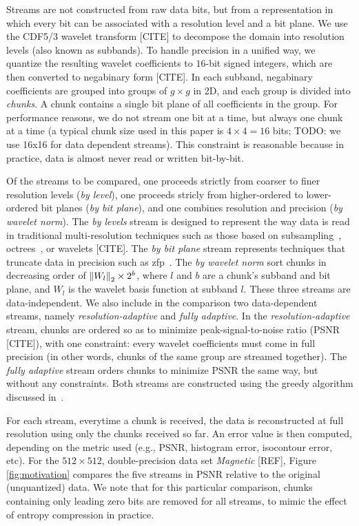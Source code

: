 Streams are not constructed from raw data bits, but from a representation in which every bit can be
associated with a resolution level and a bit plane. We use the CDF5/3 wavelet transform [CITE] to
decompose the domain into resolution levels (also known as subbands). To handle precision in a
unified way, we quantize the resulting wavelet coefficients to $16$-bit signed integers, which are
then converted to negabinary form [CITE]. In each subband, negabinary coefficients are grouped into
groups of $g \times g$ in 2D, and each group is divided into \emph{chunks}. A chunk contains a
single bit plane of all coefficients in the group. For performance reasons, we do not stream one bit
at a time, but always one chunk at a time (a typical chunk size used in this paper is $4 \times 4 =
16$ bits; TODO: we use 16x16 for data dependent streams). This constraint is reasonable because in practice, data is almost never read or written
bit-by-bit.

Of the streams to be compared, one proceeds strictly from coarser to finer resolution levels
(\emph{by level}), one proceeds stricly from higher-ordered to lower-ordered bit planes (\emph{by
bit plane}), and one combines resolution and precision (\emph{by wavelet norm}). The \emph{by
levels} stream is designed to represent the way data is read in traditional multi-resolution
techniques such as those based on subsampling~\cite{idx2001}, octrees~\cite{multires_octree1999},
or wavelets [CITE]. The
\emph{by bit plane} stream represents techniques that truncate data in precision such as zfp~\cite{zfp2014}.
The \emph{by wavelet norm} sort chunks in decreasing order of $\left\lVert W_l\right\rVert_2 \times 2^b$, where $l$
and $b$ are a chunk's subband and bit plane, and $W_l$ is the wavelet basis function at subband $l$.
These three streams are data-independent. We also include in the comparison two data-dependent
streams, namely \emph{resolution-adaptive} and \emph{fully adaptive}. In the
\emph{resolution-adaptive} stream, chunks are ordered so as to minimize peak-signal-to-noise ratio
(PSNR [CITE]), with one constraint: every wavelet coefficients must come in full precision (in other
words, chunks of the same group are streamed together). The \emph{fully adaptive} stream orders
chunks to minimize PSNR the same way, but without any constraints. Both streams are constructed
using the greedy algorithm discussed in~.

For each stream, everytime a chunk is received, the data is reconstructed at full resolution using
only the chunks received so far. An error value is then computed, depending on the metric used
(e.g., PSNR, histogram error, isocontour error, etc). For the $512 \times 512$, double-precision
data set \emph{Magnetic} [REF], Figure \ref{fig:motivation} compares the five streams in
PSNR relative to the original (unquantized) data. We note that for this particular comparison,
chunks containing only leading zero bits are removed for all streams, to mimic the effect of entropy
compression in practice.

